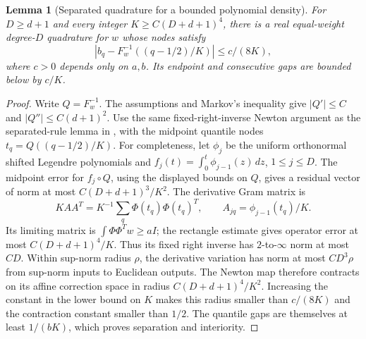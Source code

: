 \documentclass[11pt]{article}
\newtheorem{lemma}{Lemma}
\begin{document}
\begin{lemma}[Separated quadrature for a bounded polynomial density]\label{quad}
For $D\ge d+1$ and every integer $K\ge C(D+d+1)^4$, there is a real
equal-weight degree-$D$ quadrature for $w$ whose nodes satisfy
\[
 |b_q-F_w^{-1}((q-1/2)/K)|\le c/(8K),
\]
where $c>0$ depends only on $a,b$. Its endpoint and consecutive gaps
are bounded below by $c/K$.
\end{lemma}
\begin{proof}
Write $Q=F_w^{-1}$. The assumptions and Markov's inequality give
$|Q'|\le C$ and $|Q''|\le C(d+1)^2$.
Use the same fixed-right-inverse Newton argument as the separated-rule
lemma in
,
with the midpoint quantile nodes $t_q=Q((q-1/2)/K)$.
For completeness, let $\phi_j$ be the uniform orthonormal shifted
Legendre polynomials and $f_j(t)=\int_0^t\phi_{j-1}(z)\,dz$, $1\le j\le D$.
The midpoint error for $f_j\circ Q$, using the displayed bounds on $Q$,
gives a residual vector of norm at most $C(D+d+1)^3/K^2$.
The derivative Gram matrix is
\[
 KAA^T=K^{-1}\sum_q\Phi(t_q)\Phi(t_q)^T,
 \qquad A_{jq}=\phi_{j-1}(t_q)/K.
\]
Its limiting matrix is $\int\Phi\Phi^T w\ge a I$; the rectangle
estimate gives operator error at most $C(D+d+1)^4/K$.
Thus its fixed right inverse has $2$-to-$\infty$ norm at most $CD$.
Within sup-norm radius $\rho$, the derivative variation has norm at most
$CD^3\rho$ from sup-norm inputs to Euclidean outputs. The Newton map
therefore contracts on its affine correction space in radius
$C(D+d+1)^4/K^2$. Increasing the constant in the lower bound on $K$
makes this radius smaller than $c/(8K)$ and the contraction constant
smaller than $1/2$. The quantile gaps are themselves at least $1/(bK)$,
which proves separation and interiority.
\end{proof}
\end{document}
